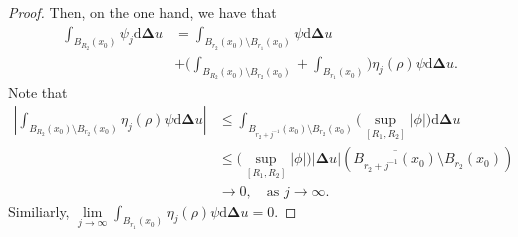 \documentclass{article}
\theoremstyle{remark}
\numberwithin{equation}{section}
\theoremstyle{definition}
\begin{document}
\begin{proof}
    Then, on the one hand, we have that
    \begin{equation}
    	\begin{split}
    		\int_{B_{R_{2}}(x_{0})} \psi_{j} \mathrm{d}\mathbf{\Delta}u & = \int_{B_{r_{2}}(x_{0}) \setminus B_{r_{1}}(x_{0})} \psi \mathrm{d}\mathbf{\Delta}u\\
    		& + \Big(\int_{B_{R_{2}}(x_{0}) \setminus B_{r_{2}}(x_{0})} + \int_{B_{r_{1}}(x_{0})} \Big) \eta_{j}(\rho) \psi \mathrm{d}\mathbf{\Delta}u.
    	\end{split}
    \end{equation}
    Note that
    \begin{equation}
    	\begin{split}
    		\left| \int_{B_{R_{2}}(x_{0}) \setminus B_{r_{2}}(x_{0})} \eta_{j}(\rho) \psi \mathrm{d}\mathbf{\Delta}u \right| & \le \int_{B_{r_{2} + j^{-1}}(x_{0}) \setminus B_{r_{2}}(x_{0})} \Big(\sup_{[R_{1},R_{2}]} \lvert \phi \rvert \Big) \mathrm{d}\mathbf{\Delta}u\\
    		& \le \Big(\sup_{[R_{1},R_{2}]}  \lvert \phi \rvert \Big) \lvert \mathbf{\Delta} u \rvert(\overline{B_{r_{2} + j^{-1}}(x_{0})} \setminus B_{r_{2}}(x_{0}))\\
    		& \to 0,\quad \text{as } j \to \infty.
    	\end{split}
    \end{equation}
    Similiarly, $\lim\limits_{j \to \infty} \int_{B_{r_{1}}(x_{0})} \eta_{j}(\rho) \psi \mathrm{d}\mathbf{\Delta}u = 0$.
    

\end{proof}
\end{document}
